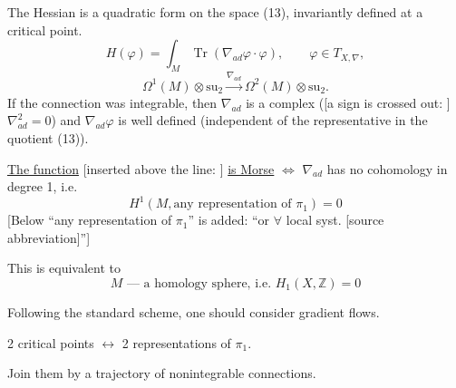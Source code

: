 The Hessian is a quadratic form on the space (13), invariantly
defined at a critical point.
\begin{equation*}
H(\varphi)=\int_M\operatorname{Tr}(\nabla_{ad}\varphi\cdot\varphi),
\qquad \varphi\in T_{X,\nabla}, \tag{14}
\end{equation*}
\begin{equation*}
\Omega^1(M)\otimes\mathrm{su}_2
\overset{\nabla_{ad}}{\longrightarrow}
\Omega^2(M)\otimes\mathrm{su}_2. \tag{15}
\end{equation*}
If the connection was integrable, then $\nabla_{ad}$ is a complex
([a sign is crossed out:
]
$\nabla_{ad}^{2}=0$)
and $\nabla_{ad}\varphi$ is well defined (independent of the representative
in the quotient (13)).

\underline{The function} [inserted above the line:
]
\underline{is Morse} $\Longleftrightarrow$ $\nabla_{ad}$ has no
cohomology in degree 1, i.e.
\begin{equation*}
H^1(M,\text{any representation of }\pi_1)=0 \tag{16}
\end{equation*}
[Below “any representation of $\pi_1$” is added: “or $\forall$ local syst. [source abbreviation]”]

This is equivalent to
\begin{equation*}
M\text{ --- a homology sphere, i.e. }H_1(X,\mathbb Z)=0 \tag{17}
\end{equation*}

Following the standard scheme, one should consider gradient flows.

2 critical points $\longleftrightarrow$ 2 representations of $\pi_1$.

Join them by a trajectory of nonintegrable connections.

